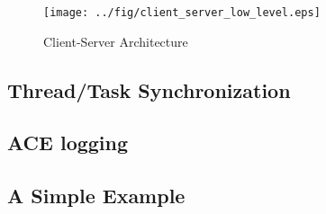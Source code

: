 \begin{figure}[!ht]
  \texttt{[image: ../fig/client\_server\_low\_level.eps]}
  \caption{Client-Server Architecture}
  \label{FIG_CLIENT_SERVER_ARCHITECTURE_LOW_LEVEL}
\end{figure}


\subsection{Thread/Task Synchronization}

\subsection{ACE logging}

\subsection{A Simple Example}




